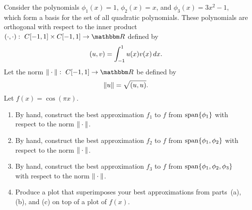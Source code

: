 Consider the polynomials $\phi_1(x) = 1$, $\phi_2(x) = x$, 
and $\phi_3(x) = 3x^2-1$, which form a basis for the set
of all quadratic polynomials.  These polynomials are 
orthogonal with respect to the inner product $\ip{\cdot,\cdot}:\mbox{ }C[-1,1]\times C[-1,1]\rightarrow\R$ defined by
\[ (u,v) = \int_{-1}^1 u(x)v(x)\, dx.\]
Let the norm $\norm{\cdot}:\mbox{ }C[-1,1]\rightarrow\R$ be defined by
\[ \|u\| = \sqrt{(u,u)}.\]
Let $f(x) = \cos(\pi x)$.
\begin{enumerate}
\item By hand, construct the best approximation $f_1$ to $f$ from ${\rm span}\{\phi_1\}$ with respect to the norm $\|\cdot\|$.
\\
\item By hand, construct the best approximation $f_2$ to $f$ from ${\rm span}\{\phi_1,\phi_2\}$ with respect to the norm $\|\cdot\|$.
\\
\item By hand, construct the best approximation $f_3$ to $f$ from ${\rm span}\{\phi_1,\phi_2,\phi_3\}$ with respect to the norm $\|\cdot\|$.
\\
\item  Produce a plot that superimposes your best approximations from parts~(a), (b), and (c) on top of a plot of $f(x)$.
\end{enumerate}



